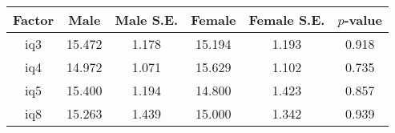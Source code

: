 \begin{longtable}{c c c c c c}
\toprule
\textbf{Factor} & \textbf{Male} & \textbf{Male S.E.}  & \textbf{Female} & \textbf{Female S.E.} & \textbf{$ p $-value} \\
\midrule
iq3 & 15.472 & 1.178 &  15.194 & 1.193 & 0.918 \\
iq4 & 14.972 & 1.071 &  15.629 & 1.102 & 0.735 \\
iq5 & 15.400 & 1.194 &  14.800 & 1.423 & 0.857 \\
iq8 & 15.263 & 1.439 &  15.000 & 1.342 & 0.939 \\
\bottomrule
\end{longtable}
